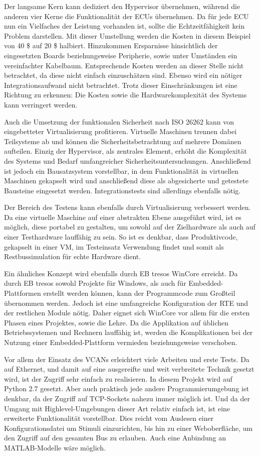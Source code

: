 \documentclass[
  a4paper,					    %
  twoside,
  DIV=calc,     				%
  bibliography=totoc,
  cleardoublepage=empty,
  ngerman,     					%
  final       					%
]{scrbook}
\begin{document}
Der langsame Kern kann dediziert den Hypervisor übernehmen, während die anderen vier Kerne die Funktionalität der ECUs übernehmen. Da für jede ECU nun ein Vielfaches der Leistung vorhanden ist, sollte die Echtzeitfähigkeit kein Problem darstellen. Mit dieser Umstellung werden die Kosten in diesem Beispiel von 40 \$ auf 20 \$ halbiert. Hinzukommen Ersparnisse hinsichtlich der eingesetzten Boards beziehungsweise Peripherie, sowie unter Umständen ein vereinfachter Kabelbaum. Entsprechende Kosten werden an dieser Stelle nicht betrachtet, da diese nicht einfach einzuschätzen sind. Ebenso wird ein nötiger Integrationsaufwand nicht betrachtet. Trotz dieser Einschränkungen ist eine Richtung zu erkennen: Die Kosten sowie die Hardwarekomplexität des Systems kann verringert werden.

Auch die Umsetzung der funktionalen Sicherheit nach ISO 26262 kann von eingebetteter Virtualisierung profitieren. Virtuelle Maschinen trennen dabei Teilsysteme ab und können die Sicherheitsbetrachtung auf mehrere Domänen aufteilen. Einzig der Hypervisor, als zentrales Element, erhöht die Komplexität des Systems und Bedarf umfangreicher Sicherheitsuntersuchungen. Anschließend ist jedoch ein Bausatzsystem vorstellbar, in dem Funktionalität in virtuellen Maschinen gekapselt wird und anschließend diese als abgesicherte und getestete Bausteine eingesetzt werden. Integrationstests sind allerdings ebenfalls nötig.

Der Bereich des Testens kann ebenfalls durch Virtualisierung verbessert werden. Da eine virtuelle Maschine auf einer abstrakten Ebene ausgeführt wird, ist es möglich, diese portabel zu gestalten, um sowohl auf der Zielhardware als auch auf einer Testhardware lauffähig zu sein. So ist es denkbar, dass Produktivcode, gekapselt in einer VM, im Testeinsatz Verwendung findet und somit als Restbussimulation für echte Hardware dient.

Ein ähnliches Konzept wird ebenfalls durch EB tresos WinCore erreicht. Da durch EB tresos sowohl Projekte für Windows, als auch für Embedded-Plattformen erstellt werden können, kann der Programmcode zum Großteil übernommen werden. Jedoch ist eine umfangreiche Konfiguration der RTE und der restlichen Module nötig. Daher eignet sich WinCore vor allem für die ersten Phasen eines Projektes, sowie die Lehre. Da die Applikation auf üblichen Betriebssystemen und Rechnern lauffähig ist, werden die Komplikationen bei der Nutzung einer Embedded-Plattform vermieden beziehungsweise verschoben.

Vor allem der Einsatz des VCANs erleichtert viele Arbeiten und erste Tests. Da auf Ethernet, und damit auf eine ausgereifte und weit verbreitete Technik gesetzt wird, ist der Zugriff sehr einfach zu realisieren. In diesem Projekt wird auf Python 2.7 gesetzt. Aber auch praktisch jede andere Programmierumgebung ist denkbar, da der Zugriff auf TCP-Sockets nahezu immer möglich ist. Und da der Umgang mit Highlevel-Umgebungen dieser Art relativ einfach ist, ist eine erweiterte Funktionalität vorstellbar. Dies reicht vom Auslesen einer Konfigurationsdatei um Stimuli einzurichten, bis hin zu einer Weboberfläche, um den Zugriff auf den gesamten Bus zu erlauben. Auch eine Anbindung an MATLAB-Modelle wäre möglich.
\end{document}
